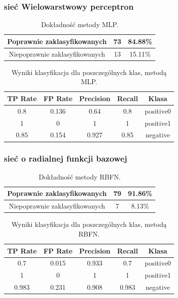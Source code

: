 \documentclass{classrep}
\begin{document}
\subsubsection{sieć Wielowarstwowy perceptron}

\begin{table}[H]
\centering
\begin{tabular}{|c|c|c|}
\hline 
Poprawnie zaklasyfikowanych & 73 & 84.88\% \\ 
\hline 
Niepoprawnie zaklasyfikowanych & 13 & 15.11\% \\ 
\hline 
\end{tabular} 
\caption{Dokładność metody MLP.}
\label{wyniki:mlpproc}
\end{table}



\begin{table}[H]
\centering
\begin{tabular}{|c|c|c|c|c|}
\hline 
TP Rate &  FP Rate & Precision &  Recall &  Klasa \\
\hline
0.8    &   0.136   &   0.64  &    0.8  &  positive0 \\
\hline
1      &   0     &     1    &     1   &   positive1 \\
\hline
0.85    &  0.154  &    0.927  &   0.85  & negative \\
\hline 
\end{tabular} 
\caption{Wyniki klasyfikacja dla poszczególnych klas, metodą MLP.}
\label{wyniki:mlpclass}
\end{table}


\subsubsection{sieć o radialnej funkcji bazowej}


\begin{table}[H]
\centering
\begin{tabular}{|c|c|c|}
\hline 
Poprawnie zaklasyfikowanych & 79 & 91.86\% \\ 
\hline 
Niepoprawnie zaklasyfikowanych & 7 & 8.13\% \\
\hline 
\end{tabular} 
\caption{Dokładność metody RBFN.}
\label{wyniki:rbfproc}
\end{table}



\begin{table}[H]
\centering
\begin{tabular}{|c|c|c|c|c|}
\hline 
TP Rate &  FP Rate &  Precision &  Recall &  Klasa\\
\hline
0.7    &   0.015  &    0.933  &   0.7 &    positive0\\
\hline
1      &   0     &     1   &      1   &    positive1\\
\hline
0.983  &   0.231   &   0.908  &   0.983  & negative\\
\hline 
\end{tabular} 

\caption{Wyniki klasyfikacja dla poszczególnych klas, metodą RBFN.}
\label{wyniki:rbfclass}
\end{table}
\end{document}
